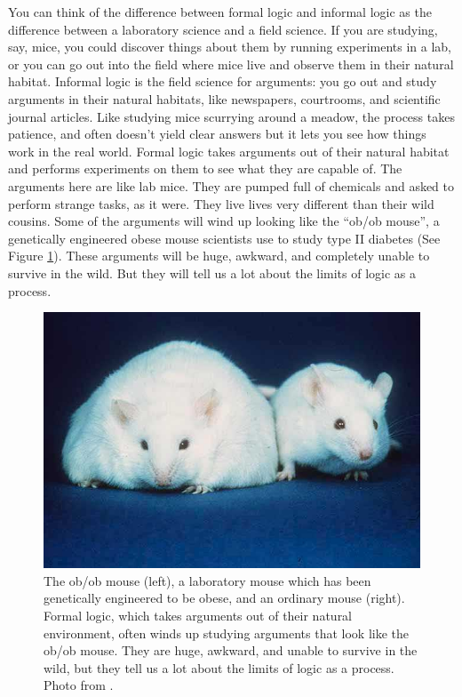 You can think of the difference between formal logic and informal logic as the difference between a laboratory science and a field science. \label{lab_vs._field_science} If you are studying, say, mice, you could discover things about them by running experiments in a lab, or you can go out into the field where mice live and observe them in their natural habitat.  Informal logic is the field science for arguments: you go out and study arguments in their natural habitats, like newspapers, courtrooms, and scientific journal articles. Like studying mice scurrying around a meadow, the process takes patience, and often doesn't yield clear answers but it lets you see how things work in the real world. Formal logic takes arguments out of their natural habitat and performs experiments on them to see what they are capable of. The arguments here are like lab mice. They are pumped full of chemicals and asked to perform strange tasks, as it were. They live lives very different than their wild cousins. Some of the arguments will wind up looking like the ``ob/ob mouse'', a genetically engineered obese mouse scientists use to study type II diabetes (See Figure \ref{fig:ob_ob_mouse}). These arguments will be huge, awkward, and completely unable to survive in the wild. But they will tell us a lot about the limits of logic as a process.

\begin{figure}
\begin{mdframed}[style=mytableclearbox]
\begin{center}
\includegraphics*{img/Fatmouse}
\end{center}
\end{mdframed}
\caption{The ob/ob mouse (left), a laboratory mouse which has been genetically engineered to be obese, and an ordinary mouse (right). Formal logic, which takes arguments out of their natural environment, often winds up studying arguments that look like the ob/ob mouse. They are huge, awkward, and unable to survive in the wild, but they tell us a lot about the limits of logic as a process. Photo from \cite{WikimediaCommons2006}.}
\label{fig:ob_ob_mouse}
\end{figure}


